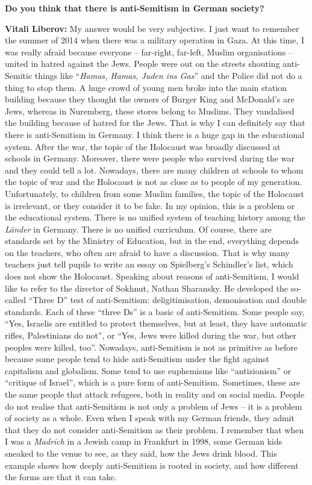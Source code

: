 \textbf{Do you think that there is anti-Semitism in German society?} 

\textbf{Vitali Liberov:} My answer would be very subjective. I just want to remember the summer of 2014 when there was a military operation in Gaza. At this time, I was really afraid because everyone – far-right, far-left, Muslim organisations – united in hatred against the Jews. People were out on the streets shouting anti-Semitic things like ``\textit{Hamas, Hamas, Juden ins Gas}'' and the Police did not do a thing to stop them. A huge crowd of young men broke into the main station building because they thought the owners of Burger King and McDonald’s are Jews, whereas in Nuremberg, these stores belong to Muslims. They vandalised the building because of hatred for the Jews. That is why I can definitely say that there is anti-Semitism in Germany. I think there is a huge gap in the educational system. After the war, the topic of the Holocaust was broadly discussed at schools in Germany. Moreover, there were people who survived during the war and they could tell a lot. Nowadays, there are many children at schools to whom the topic of war and the Holocaust is not as close as to people of my generation. Unfortunately, to children from some Muslim families, the topic of the Holocaust is irrelevant, or they consider it to be fake. In my opinion, this is a problem or the educational system. There is no unified system of teaching history among the \textit{Länder} in Germany. There is no unified curriculum. Of course, there are standards set by the Ministry of Education, but in the end, everything depends on the teachers, who often are afraid to have a discussion. That is why many teachers just tell pupils to write an essay on Spielberg’s Schindler’s list, which does not show the Holocaust. Speaking about reasons of anti-Semitism, I would like to refer to the director of Sokhnut, Nathan Sharansky. He developed the so-called ``Three D'' test of anti-Semitism: deligitimisation, demonisation and double standards. Each of these ``three Ds'' is a basic of anti-Semitism. Some people say, ``Yes, Israelis are entitled to protect themselves, but at least, they have automatic rifles, Palestinians do not'', or ``Yes, Jews were killed during the war, but other peoples were killed, too''. Nowadays, anti-Semitism is not as primitive as before because some people tend to hide anti-Semitism under the fight against capitalism and globalism. Some tend to use euphemisms like ``antizionism'' or ``critique of Israel'', which is a pure form of anti-Semitism. Sometimes, these are the same people that attack refugees, both in reality and on social media. People do not realise that anti-Semitism is not only a problem of Jews – it is a problem of society as a whole. Even when I speak with my German friends, they admit that they do not consider anti-Semitism as their problem. I remember that when I was a \textit{Madrich} in a Jewish camp in Frankfurt in 1998, some German kids sneaked to the venue to see, as they said, how the Jews drink blood. This example shows how deeply anti-Semitism is rooted in society, and how different the forms are that it can take.  

